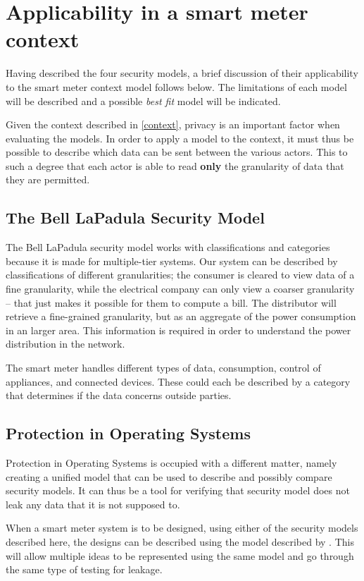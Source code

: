 \section{Applicability in a smart meter context}
Having described the four security models, a brief discussion of their applicability to the smart meter context model follows below.
The limitations of each model will be described and a possible \emph{best fit} model will be indicated.

Given the context described in \cref{context}, privacy is an important factor when evaluating the models.
In order to apply a model to the context, it must thus be possible to describe which data can be sent between the various actors.
This to such a degree that each actor is able to read \textbf{only} the granularity of data that they are permitted.

\subsection{The Bell LaPadula Security Model}
The Bell LaPadula security model works with classifications and categories because it is made for multiple-tier systems.
Our system can be described by classifications of different granularities; the consumer is cleared to view data of a fine granularity, while the electrical company can only view a coarser granularity -- that just makes it possible for them to compute a bill.
The distributor will retrieve a fine-grained granularity, but as an aggregate of the power consumption in an larger area.
This information is required in order to understand the power distribution in the network.

The smart meter handles different types of data, consumption, control of appliances, and connected devices.
These could each be described by a category that determines if the data concerns outside parties.

\subsection{Protection in Operating Systems}
Protection in Operating Systems is occupied with a different matter, namely creating a unified model that can be used to describe and possibly compare security models.
It can thus be a tool for verifying that security model does not leak any data that it is not supposed to.

When a smart meter system is to be designed, using either of the security models described here, the designs can be described using the model described by \citet{HRU}.
This will allow multiple ideas to be represented using the same model and go through the same type of testing for leakage.

